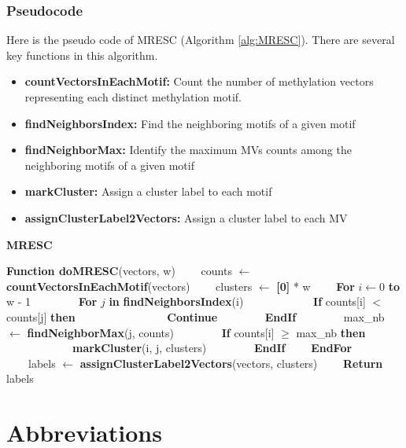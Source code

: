 \documentclass[12pt,letterpaper]{article}
\begin{document}
\subsubsection{Pseudocode}

Here is the pseudo code of MRESC (Algorithm \ref{alg:MRESC}). There are several key 
functions in this algorithm.

\begin{itemize}
    \item  \textbf{countVectorsInEachMotif:} Count the number of methylation vectors representing each 
    distinct methylation motif.
    \item  \textbf{findNeighborsIndex:} Find the neighboring motifs of a given motif
    \item  \textbf{findNeighborMax:} Identify the maximum MVs counts among the neighboring motifs of a given motif
    \item  \textbf{markCluster:} Assign a cluster label to each motif
    \item  \textbf{assignClusterLabel2Vectors:} Assign a cluster label to each MV
\end{itemize}

\begin{algorithm}[H]
    \caption{\textbf{MRESC}}
    \label{alg:MRESC}
    \begin{algorithmic}
        \STATE \textbf{Function doMRESC}(vectors, w)
        \STATE \ \ \ \ counts $\gets$ \textbf{countVectorsInEachMotif}(vectors)
        \STATE \ \ \ \ clusters $\gets$ \textbf{[0]} * w
        \STATE \ \ \ \ \textbf{For} $i \gets 0$ \textbf{to} w - 1
        \STATE \ \ \ \ \ \ \ \ \textbf{For} $j$ \textbf{in} \textbf{findNeighborsIndex}(i)
        \STATE \ \ \ \ \ \ \ \ \ \ \ \ \textbf{If} counts[i] $<$ counts[j] \textbf{then}
        \STATE \ \ \ \ \ \ \ \ \ \ \ \ \ \ \ \ \textbf{Continue}
        \STATE \ \ \ \ \ \ \ \ \textbf{EndIf}
        \STATE \ \ \ \ \ \ \ \ max\_nb $\gets$ \textbf{findNeighborMax}(j, counts)
        \STATE \ \ \ \ \ \ \ \ \textbf{If} counts[i] $\geq$ max\_nb \textbf{then}
        \STATE \ \ \ \ \ \ \ \ \ \ \ \ \textbf{markCluster}(i, j, clusters)
        \STATE \ \ \ \ \ \ \ \ \textbf{EndIf}
        \STATE \ \ \ \ \textbf{EndFor}
        \STATE \ \ \ \ labels $\gets$ \textbf{assignClusterLabel2Vectors}(vectors, clusters)
        \STATE \ \ \ \ \textbf{Return} labels
        \end{algorithmic}
\end{algorithm}

\section{Abbreviations}\label{sec:abbr}
\end{document}
